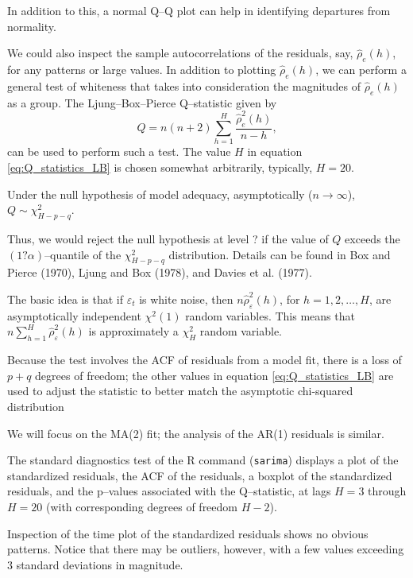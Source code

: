 \documentclass[
paper=128mm:96mm, %
fontsize=9.5pt, %
pagesize, %
parskip=half-, %
]{scrartcl} %
\theoremstyle{mythmstyle} %
\begin{document}
In addition to this, a normal Q--Q plot can help in identifying departures from normality.

We could also inspect the sample autocorrelations of the residuals, say, $\widehat{\rho}_e(h)$, for any patterns or large values. In addition to plotting $\widehat{\rho}_e(h)$, we can perform a general test of whiteness that takes into consideration the magnitudes of $\widehat{\rho}_e(h)$ as a group. The Ljung--Box--Pierce Q--statistic given by
%
\begin{equation}
\label{eq:Q_statistics_LB}
Q=n(n+2)\sum_{h=1}^H\frac{\widehat{\rho}^2_e(h)}{n-h},
\end{equation}
%
can be used to perform such a test. The value $H$ in equation \eqref{eq:Q_statistics_LB} is chosen somewhat arbitrarily, typically, $H = 20$. 

Under the null hypothesis of model adequacy, asymptotically ($n\to\infty$), $Q\sim\chi^2_{H-p-q}$. 

Thus, we would reject the null hypothesis at level ? if the value of $Q$ exceeds the $(1 ? \alpha)$--quantile of the $\chi^2_{H-p-q}$ distribution. Details can be found in Box and Pierce (1970), Ljung and Box (1978), and Davies et al. (1977). 
\clearpage

The basic idea is that if $\varepsilon_t$ is white noise, then $n\widehat{\rho}^2_\varepsilon(h)$, for $h = 1,2,\dots,H$, are asymptotically independent $\chi^2(1)$ random variables. This means that $n\sum_{h=1}^H\widehat{\rho}^2_\varepsilon(h)$ is approximately a $\chi_H^2$ random variable. 
 
Because the test involves the ACF of residuals from a model fit, there is a loss of $p + q$ degrees of freedom; the other values in equation \eqref{eq:Q_statistics_LB} are used to adjust the statistic to better match the asymptotic chi-squared distribution
\clearpage

We will focus on the MA(2) fit; the analysis of the AR(1) residuals is similar. 

The standard diagnostics test of the R command (\texttt{sarima}) displays a plot of the standardized residuals, the ACF of the residuals, a boxplot of the standardized residuals, and the p--values associated with the Q--statistic, at lags $H = 3$ through $H = 20$ (with corresponding degrees of freedom $H-2$).

Inspection of the time plot of the standardized residuals shows no obvious patterns. Notice that there may be outliers, however, with a few values exceeding 3 standard deviations in magnitude. 
\end{document}
